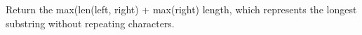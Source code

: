 \documentclass[preview]{standalone}
\begin{document}
Return the max(len(left, right) + max(right) length, which represents the longest substring without repeating characters.\\
\end{document}
